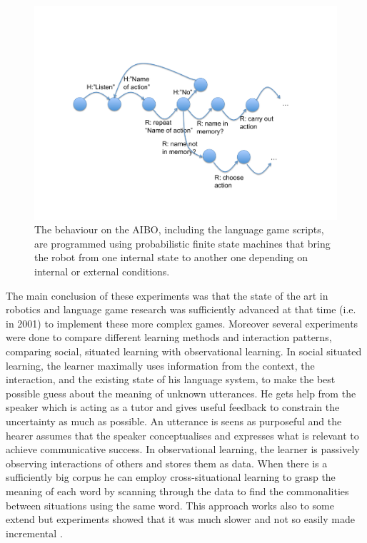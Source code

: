 \begin{figure}[htbp]
  \centerline{\includegraphics[width=.70\textwidth]{chap10/figs/fsm.pdf}}
\caption{\label{fig:fsm} 
The behaviour on the AIBO, including the language game scripts, are programmed using probabilistic finite state 
machines that bring the robot from one internal state to another one depending on internal or external conditions.}
\end{figure}

The main conclusion of these experiments was that the state of the art in robotics and language
game research was sufficiently advanced at that time (i.e. in 
2001) to implement these more complex games. Moreover several experiments were done to compare
different learning methods and interaction patterns, comparing social, situated learning with 
observational learning. In social situated learning, 
the learner maximally uses information from the context, the 
interaction, and the existing state of his language system, to make the best possible guess about the meaning of 
unknown utterances. He gets help from the speaker which is acting as a tutor and gives useful feedback to constrain 
the uncertainty as much as possible. An utterance is seens as purposeful and the hearer assumes that the speaker conceptualises
and expresses what is relevant to achieve communicative success. In observational learning, the learner is 
passively observing interactions of others and stores them as data. When there is a sufficiently big 
corpus he can employ cross-situational learning to grasp the meaning of each word by scanning 
through the data to find the commonalities between 
situations using the same word. This approach works also to some extend but experiments showed that it was much slower and 
not so easily made incremental \citep{DeBeule:2006}. 

